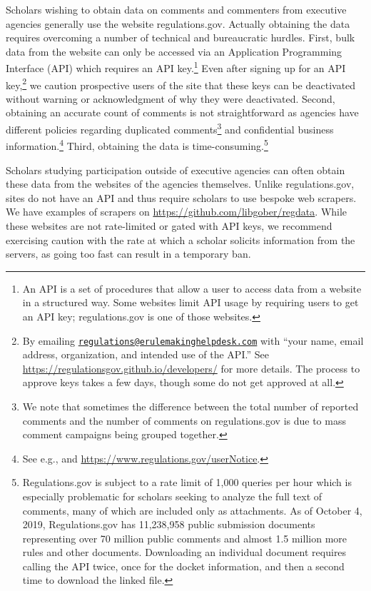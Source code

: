 \documentclass[
      12pt,
        ]{article}
\begin{document}
Scholars wishing to obtain data on comments and commenters from
executive agencies generally use the website regulations.gov. Actually
obtaining the data requires overcoming a number of technical and
bureaucratic hurdles. First, bulk data from the website can only be
accessed via an Application Programming Interface (API) which requires
an API key.\footnote{An API is a set of procedures that allow a user to
  access data from a website in a structured way. Some websites limit
  API usage by requiring users to get an API key; regulations.gov is one
  of those websites.} Even after signing up for an API key,\footnote{By
  emailing
  \href{mailto:regulations@erulemakinghelpdesk.com}{\nolinkurl{regulations@erulemakinghelpdesk.com}}
  with ``your name, email address, organization, and intended use of the
  API.'' See \url{https://regulationsgov.github.io/developers/} for more
  details. The process to approve keys takes a few days, though some do
  not get approved at all.} we caution prospective users of the site
that these keys can be deactivated without warning or acknowledgment of
why they were deactivated. Second, obtaining an accurate count of
comments is not straightforward as agencies have different policies
regarding duplicated comments\footnote{We note that sometimes the
  difference between the total number of reported comments and the
  number of comments on regulations.gov is due to mass comment campaigns
  being grouped together.} and confidential business
information.\footnote{See e.g., \citet{Lubbers2012} and
  \url{https://www.regulations.gov/userNotice}.} Third, obtaining the
data is time-consuming.\footnote{Regulations.gov is subject to a rate
  limit of 1,000 queries per hour which is especially problematic for
  scholars seeking to analyze the full text of comments, many of which
  are included only as attachments. As of October 4, 2019,
  Regulations.gov has 11,238,958 public submission documents
  representing over 70 million public comments and almost 1.5 million
  more rules and other documents. Downloading an individual document
  requires calling the API twice, once for the docket information, and
  then a second time to download the linked file.}

Scholars studying participation outside of executive agencies can often
obtain these data from the websites of the agencies themselves. Unlike
regulations.gov, sites do not have an API and thus require scholars to
use bespoke web scrapers. We have examples of scrapers on
\url{https://github.com/libgober/regdata}. While these websites are not
rate-limited or gated with API keys, we recommend exercising caution
with the rate at which a scholar solicits information from the servers,
as going too fast can result in a temporary ban.
\end{document}

